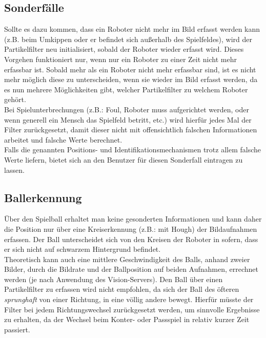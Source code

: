 \documentclass{ezb}
\begin{document}
\subsection{Sonderfälle}
Sollte es dazu kommen, dass ein Roboter nicht mehr im Bild erfasst werden kann (z.B. beim Umkippen oder er befindet sich außerhalb des Spielfeldes), wird der Partikelfilter neu initialisiert, sobald der Roboter wieder erfasst wird. Dieses Vorgehen funktioniert nur, wenn nur ein Roboter zu einer Zeit nicht mehr erfassbar ist. Sobald mehr als ein Roboter nicht mehr erfassbar sind, ist es nicht mehr möglich diese zu unterscheiden, wenn sie wieder im Bild erfasst werden, da es nun mehrere Möglichkeiten gibt, welcher Partikelfilter zu welchem Roboter gehört.\\
\linebreak
Bei Spielunterbrechungen (z.B.: Foul, Roboter muss aufgerichtet werden, oder wenn generell ein Mensch das Spielfeld betritt, etc.)  wird hierfür jedes Mal der Filter zurückgesetzt, damit dieser nicht mit offensichtlich falschen Informationen arbeitet und falsche Werte berechnet.\\
\linebreak
Falls die genannten Positions- und Identifikationsmechanismen trotz allem falsche Werte liefern, bietet sich an den Benutzer für diesen Sonderfall eintragen zu lassen.
\subsection{Ballerkennung}
Über den Spielball erhaltet man keine gesonderten Informationen und kann daher die Position nur über eine Kreiserkennung (z.B.: mit Hough) der Bildaufnahmen erfassen. Der Ball unterscheidet sich von den Kreisen der Roboter in sofern, dass er sich nicht auf schwarzem Hintergrund befindet.\\
\linebreak
Theoretisch kann auch eine mittlere Geschwindigkeit des Balls, anhand zweier Bilder, durch die Bildrate und der Ballposition auf beiden Aufnahmen, errechnet werden (je nach Anwendung des Vision-Servers). Den Ball über einen Partikelfilter zu erfassen wird nicht empfohlen, da sich der Ball des öfteren \textit{sprunghaft} von einer Richtung, in eine völlig andere bewegt. Hierfür müsste der Filter bei jedem Richtungswechsel zurückgesetzt werden, um sinnvolle Ergebnisse zu erhalten, da der Wechsel beim Konter- oder Passspiel in relativ kurzer Zeit passiert.
\end{document}
